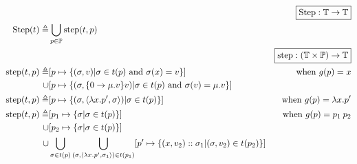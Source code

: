 \documentclass{article}
\begin{document}
\begin{align*}
                        &                                                                                                                                                                        & \fbox{$\Step:\mathbb{T}\rightarrow\mathbb{T}$}                   \\
  \Step(t)   \triangleq & \bigcup_{p\in\mathbb{P}}\step(t,p)                                                                                                                                                                                                        \\
                        &                                                                                                                                                                        & \fbox{$\step:(\mathbb{T}\times\mathbb{P})\rightarrow\mathbb{T}$} \\
  \step(t,p) \triangleq & [p\mapsto\{(\ctx,v)|\ctx\in t(p)\text{ and }\ctx(x)=v\}]                                                                                                               & \text{when }g(p)=x                                               \\
  \cup                  & [p\mapsto\{(\ctx,\openloc{\mu.v}{v})|\ctx\in t(p)\text{ and }\ctx(v)=\mu.v\}]                                                                                                                                                             \\
  \step(t,p) \triangleq & [p\mapsto\{(\ctx,\langle\lambda x.p',\ctx\rangle)|\ctx\in t(p)\}]                                                                                                      & \text{when }g(p)=\lambda x.p'                                    \\
  \step(t,p) \triangleq & [p_1\mapsto\{\ctx|\ctx\in t(p)\}]                                                                                                                                      & \text{when }g(p)=p_1\:p_2                                        \\
  \cup                  & [p_2\mapsto\{\ctx|\ctx\in t(p)\}]                                                                                                                                                                                                         \\
  \cup                  & \bigcup_{\ctx\in t(p)}\bigcup_{(\ctx,\langle\lambda x.p',\ctx_1\rangle)\in t(p_1)}[p'\mapsto\{(x,v_2)\cons\ctx_1|(\ctx,v_2)\in t(p_2)\}]                                                                                                  \\

\end{align*}
\end{document}
